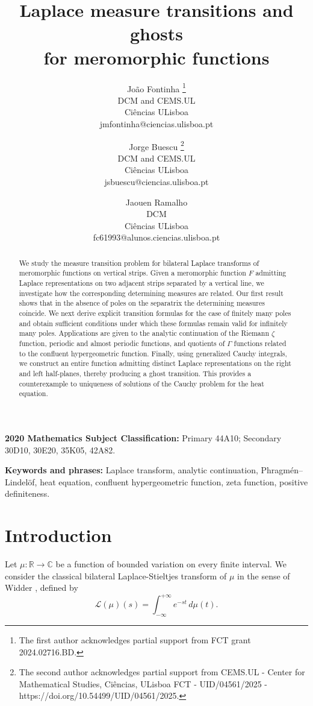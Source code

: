 \documentclass[12pt]{article}
\title{Laplace measure transitions and ghosts\\ for meromorphic functions}
\author{João Fontinha \thanks{The first author acknowledges partial support from FCT grant 2024.02716.BD.} \\ DCM and CEMS.UL \\ Ciências ULisboa  \\ jmfontinha@ciencias.ulisboa.pt  \and  Jorge Buescu \thanks{The second author acknowledges partial support from CEMS.UL - Center for Mathematical Studies, Ciências, ULisboa
FCT - UID/04561/2025 - https://doi.org/10.54499/UID/04561/2025.}\\ DCM and CEMS.UL \\ Ciências ULisboa \\ jsbuescu@ciencias.ulisboa.pt \and  Jaouen Ramalho \\ DCM \\ Ciências ULisboa \\ fc61993@alunos.ciencias.ulisboa.pt}
\theoremstyle{definition}
\begin{document}
\maketitle
\begingroup
\renewcommand{\thefootnote}{}
\endgroup
\printindex
\vspace{-0.3em}
\begin{abstract}
We study the measure transition problem for bilateral Laplace transforms of meromorphic functions on vertical strips. Given a meromorphic function \(F\) admitting Laplace representations on two adjacent strips separated by a vertical line, we investigate how the corresponding determining measures are related. Our first result shows  that in the absence of poles on the separatrix the determining measures coincide. We next derive explicit transition formulas for the case of finitely many poles and obtain sufficient conditions under which these formulas remain valid for infinitely many poles. Applications are given to the analytic continuation of the Riemann $\zeta$ function, periodic and almost periodic functions, and quotients of $\Gamma$ functions related to the confluent hypergeometric function. Finally, using generalized Cauchy integrals, we construct an entire function admitting distinct Laplace representations on the right and left half-planes, thereby producing a ghost transition. This  provides a counterexample to uniqueness of solutions of the Cauchy problem for the heat equation.
\end{abstract}
\medskip

\noindent \textbf{2020 Mathematics Subject Classification:}
Primary 44A10; Secondary 30D10, 30E20, 35K05, 42A82.

\medskip
\vspace{-0.60em}
\noindent \textbf{Keywords and phrases:}
Laplace transform, analytic continuation, Phragmén--Lindelöf, heat equation, confluent hypergeometric function, zeta function, positive definiteness. 


\section{Introduction}


Let $\mu: \mathbb{R} \longrightarrow \mathbb{C}$ be a function of bounded variation on every finite interval. We consider the  classical bilateral Laplace-Stieltjes transform of $\mu$ in the sense of Widder \cite{Widder}, defined by \begin{equation}\label{eq:Lapdef} \mathcal{L}(\mu)(s)= \int_{- \infty}^{+ \infty} e^{-st} \,d\mu(t). \end{equation}
\end{document}
